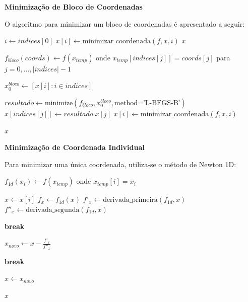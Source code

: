 \documentclass[12pt,a4paper]{article}
\begin{document}
\vspace{1cm}
\textbf{Minimização de Bloco de Coordenadas}

O algoritmo para minimizar um bloco de coordenadas é apresentado a seguir:

\begin{algorithm}[H]
\caption{Minimização de Bloco de Coordenadas}
\label{alg:block_minimization}


    \State $i \leftarrow indices[0]$
    \State $x[i] \leftarrow \text{minimizar\_coordenada}(f, x, i)$
    \State \Return $x$
\EndIf

\State $f_{bloco}(coords) \leftarrow f(x_{temp})$ onde $x_{temp}[indices[j]] = coords[j]$ para $j = 0, \ldots, |indices|-1$

\State $x_0^{bloco} \leftarrow [x[i] : i \in indices]$

\State $resultado \leftarrow \text{minimize}(f_{bloco}, x_0^{bloco}, \text{method='L-BFGS-B'})$
        \State $x[indices[j]] \leftarrow resultado.x[j]$
    \EndFor
\Else
        \State $x[i] \leftarrow \text{minimizar\_coordenada}(f, x, i)$
    \EndFor
\EndIf

\State \Return $x$
\end{algorithm}

\vspace{1cm}
\textbf{Minimização de Coordenada Individual}

Para minimizar uma única coordenada, utiliza-se o método de Newton 1D:

\begin{algorithm}[H]
\caption{Método de Newton 1D}
\label{alg:newton_1d}


\State $f_{1d}(x_i) \leftarrow f(x_{temp})$ onde $x_{temp}[i] = x_i$

\State $x \leftarrow x[i]$
    \State $f_x \leftarrow f_{1d}(x)$
    \State $f'_x \leftarrow \text{derivada\_primeira}(f_{1d}, x)$
    \State $f''_x \leftarrow \text{derivada\_segunda}(f_{1d}, x)$
    
        \State \textbf{break}
    \EndIf
    
    \State $x_{novo} \leftarrow x - \frac{f'_x}{f''_x}$
    
        \State \textbf{break}
    \EndIf
    
    \State $x \leftarrow x_{novo}$
\EndFor

\State \Return $x$
\end{algorithm}
\end{document}

